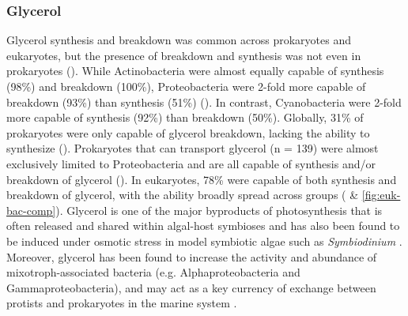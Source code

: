 \documentclass[utf8]{frontiersSCNS} %
\begin{document}
\subsubsection*{Glycerol}
Glycerol synthesis and breakdown was common across prokaryotes and eukaryotes, but the presence of breakdown and synthesis was not even in prokaryotes (). While Actinobacteria were almost equally capable of synthesis (98\%) and breakdown (100\%), Proteobacteria were 2-fold more capable of breakdown (93\%) than synthesis (51\%) (). In contrast, Cyanobacteria were 2-fold more capable of synthesis (92\%) than breakdown (50\%). Globally, 31\% of prokaryotes were only capable of glycerol breakdown, lacking the ability to synthesize (). Prokaryotes that can transport glycerol (n = 139) were almost exclusively limited to Proteobacteria and are all capable of synthesis and/or breakdown of glycerol (). In eukaryotes, 78\% were capable of both synthesis and breakdown of glycerol, with the ability broadly spread across groups ( \& \ref{fig:euk-bac-comp}). Glycerol is one of the major byproducts of photosynthesis that is often released and shared within algal-host symbioses and has also been found to be induced under osmotic stress in model symbiotic algae such as \emph{Symbiodinium} \citep{Suesc_n_Bol_var_2016, Mayfield_2007}. Moreover, glycerol has been found to increase the activity and abundance of mixotroph-associated bacteria (e.g. Alphaproteobacteria and Gammaproteobacteria), and may act as a key currency of exchange between protists and prokaryotes in the marine system \citep{Poddar_2018}.  
\end{document}
